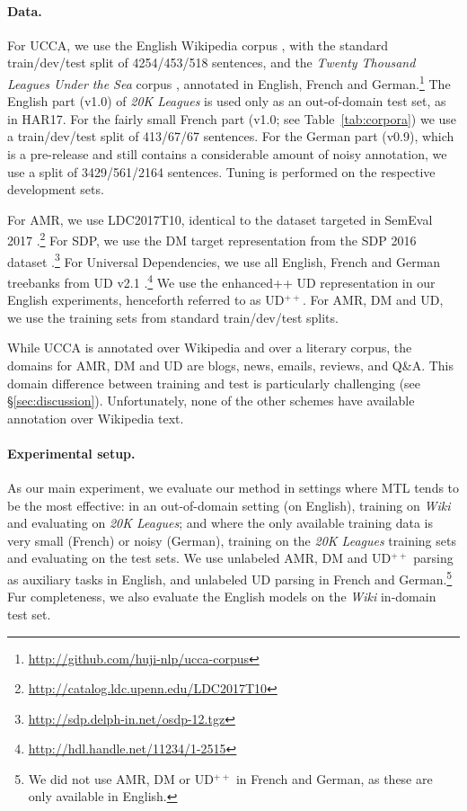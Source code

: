 \documentclass[11pt,a4paper]{article}
\begin{document}
\paragraph{Data.}

For UCCA, we use the English Wikipedia corpus \cite[v1.2; ][]{abend2013universal},
with the standard train/dev/test split of 4254/453/518 sentences,
and the \textit{Twenty Thousand Leagues Under the Sea} corpus
\cite[\textit{20K Leagues};][]{sulem2015conceptual},
annotated in English, French and German.\footnote{\mbox{\url{http://github.com/huji-nlp/ucca-corpus}}}
The English part (v1.0) of \textit{20K Leagues} is used only as an out-of-domain test set, as in HAR17.
For the fairly small French part (v1.0; see Table~\ref{tab:corpora})
we use a train/dev/test split of 413/67/67 sentences.
For the German part (v0.9), which is a pre-release and still contains a considerable amount of noisy
annotation,
we use a split of 3429/561/2164 sentences.
Tuning is performed on the respective development sets.

For AMR, we use LDC2017T10, identical to the dataset targeted in SemEval 2017
\cite{may2017semeval}.\footnote{\mbox{\url{http://catalog.ldc.upenn.edu/LDC2017T10}}}
For SDP, we use the DM target representation from the SDP 2016 dataset
\cite{oepen2016towards}.\footnote{\url{http://sdp.delph-in.net/osdp-12.tgz}}
For Universal Dependencies, we use all English, French and German treebanks from UD v2.1
\cite{11234/1-2515}.\footnote{\url{http://hdl.handle.net/11234/1-2515}}
We use the enhanced++ UD representation \cite{SCHUSTER16.779} in our English experiments,
henceforth referred to as UD$^{++}$.
For AMR, DM and UD, we use the training sets from standard train/dev/test splits.

While UCCA is annotated over Wikipedia and over a literary corpus,
the domains for AMR, DM and UD are blogs, news, emails, reviews, and Q\&A.
This domain difference between training and test is particularly challenging (see \S\ref{sec:discussion}).
Unfortunately, none of the other schemes have available annotation over Wikipedia text.

\paragraph{Experimental setup.}

As our main experiment, we evaluate our method in settings where MTL tends to be the most effective:
in an out-of-domain setting (on English),
training on \textit{Wiki} and evaluating on \textit{20K Leagues};
and where the only available training data is very small (French)
or noisy (German), training on the \textit{20K Leagues} training sets and evaluating on the test sets.
We use unlabeled AMR, DM and UD$^{++}$ parsing as auxiliary tasks in English,
and unlabeled UD parsing in French and German.\footnote{We did not use AMR, DM or UD$^{++}$ in French
and German, as these are only available in English.}
Fur completeness, we also evaluate the English models on the \textit{Wiki} in-domain test set.
\end{document}
